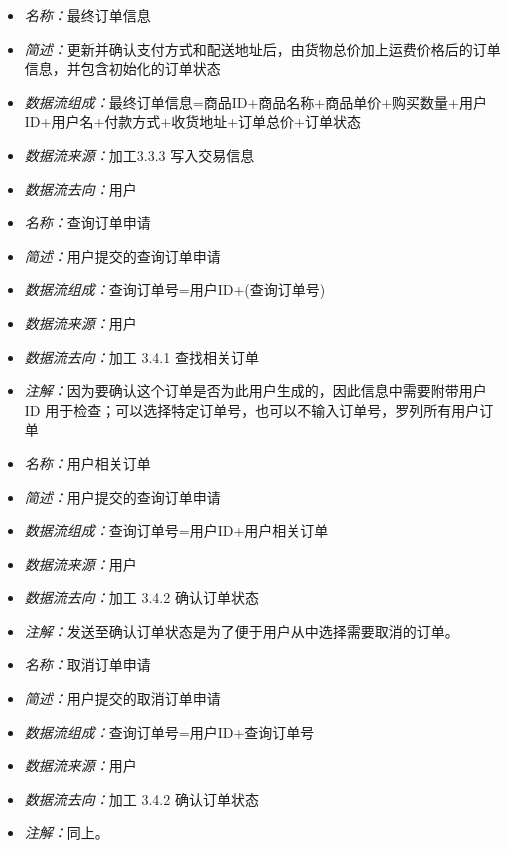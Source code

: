 \vspace{-1mm}

\begin{itemize}
	\item \textit{名称：}最终订单信息
	\item \textit{简述：}更新并确认支付方式和配送地址后，由货物总价加上运费价格后的订单信息，并包含初始化的订单状态
	\item \textit{数据流组成：}最终订单信息=商品ID+商品名称+商品单价+购买数量+用户ID+用户名+付款方式+收货地址+订单总价+订单状态
	\item \textit{数据流来源：}加工3.3.3 写入交易信息
	\item \textit{数据流去向：}用户
\end{itemize}

\vspace{-1mm}

\begin{itemize}
	\item \textit{名称：}查询订单申请
	\item \textit{简述：}用户提交的查询订单申请
	\item \textit{数据流组成：}查询订单号=用户ID+(查询订单号)
	\item \textit{数据流来源：}用户
	\item \textit{数据流去向：}加工 3.4.1 查找相关订单
	\item \textit{注解：}因为要确认这个订单是否为此用户生成的，因此信息中需要附带用户 ID 用于检查；可以选择特定订单号，也可以不输入订单号，罗列所有用户订单
\end{itemize}

\vspace{-1mm}

\begin{itemize}
\item \textit{名称：}用户相关订单
	\item \textit{简述：}用户提交的查询订单申请
	\item \textit{数据流组成：}查询订单号=用户ID+用户相关订单
	\item \textit{数据流来源：}用户
	\item \textit{数据流去向：}加工 3.4.2 确认订单状态
	\item \textit{注解：}发送至确认订单状态是为了便于用户从中选择需要取消的订单。
\end{itemize}

\vspace{-1mm}

\begin{itemize}
\item \textit{名称：}取消订单申请
	\item \textit{简述：}用户提交的取消订单申请
	\item \textit{数据流组成：}查询订单号=用户ID+查询订单号
	\item \textit{数据流来源：}用户
	\item \textit{数据流去向：}加工 3.4.2 确认订单状态
	\item \textit{注解：}同上。
\end{itemize}

